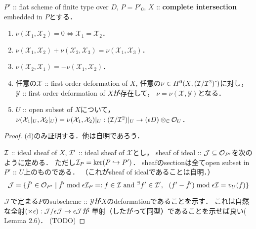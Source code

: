 \documentclass[a4paper]{jsarticle}
\newcommand{\defX}{\mathcal{X}}
\newcommand{\defY}{\mathcal{Y}}
\begin{document}
    \begin{Prop} \label{prop:properties_of_nu}
        $P'$ :: flat scheme of finite type over $D$, $P=P'_{0}$, 
        $X$ :: \textbf{complete intersection} embedded in $P$とする．
        \begin{enumerate}[label=(\alph*), leftmargin=*]
            \item $\nu(\defX_1, \defX_2)=0 \iff \defX_1=\defX_2$．

            \item $\nu(\defX_1, \defX_2)+\nu(\defX_2, \defX_3)=\nu(\defX_1, \defX_3)$．

            \item $\nu(\defX_2, \defX_1)=-\nu(\defX_1, \defX_2)$．

            \item
                任意の$\defX$ :: first order deformation of $X$, 
                任意の$\nu \in H^0(X, (\mathcal{I}/\mathcal{I}^2)\,\hat{}\,)$に対し，
                $\defY$ :: first order deformation of $X$が存在して，
                $\nu=\nu(\defX, \defY)$となる．

            \item
                $U$ :: open subset of $X$について，
                $\nu(\defX_1|_U, \defX_2|_U)=\nu(\defX_1, \defX_2)|_U:
                (\shI/\shI^2)|_U \to (\epsilon D) \otimes_{\C} \shO_U$．
        \end{enumerate}
    \end{Prop}
    \begin{proof}
        (d)のみ証明する．他は自明であろう．
        
        $\mathcal{I}$ :: ideal sheaf of $X$,
        $\mathcal{I}'$ :: ideal sheaf of $\defX$とし，
        sheaf of ideal :: $\mathcal{J} \subseteq \mathcal{O}_{P'}$を次のように定める．
        ただし$\mathcal{I}_P=\ker (P \hookrightarrow P')$．
        sheafのsectionは全てopen subset in $P'$ :: $U$上のものである．
        （これがsheaf of idealであることは自明．）
        \[
            \mathcal{J}=\{ \tilde{f}' \in \mathcal{O}_{P'} \mid
                \tilde{f}' \bmod \epsilon \mathcal{I}_{P}=:f \in \mathcal{I} \text{ and } 
                {}^{\exists} f' \in \mathcal{I}',~~
                (f'-\tilde{f}') \bmod \epsilon \mathcal{I}=v_U(f) \}
        \]

        $\mathcal{J}$で定まる$P$のsubscheme :: $\defY$が$X$のdeformationであることを示す．
        これは自然な全射$(\times \epsilon): \mathcal{J}/\epsilon \mathcal{J} \to \epsilon \mathcal{J}$が
        単射（したがって同型）であることを示せば良い(\cite{DefLCI} Lemma 2.6)．
        (TODO)
    \end{proof}
\end{document}

